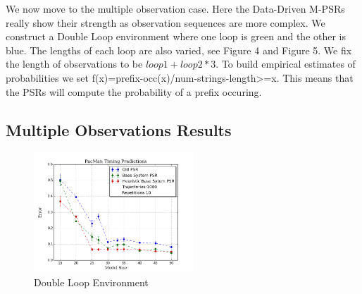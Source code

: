 We now move to the multiple observation case. Here the Data-Driven M-PSRs really show their strength as observation sequences are more complex. We construct a Double Loop environment where one loop is green and the other is blue. The lengths of each loop are also varied, see Figure 4 and Figure 5. We fix the length of observations to be $loop1 + loop2 * 3$. To build empirical estimates of probabilities we set f(x)=prefix-occ(x)/num-strings-length>=x. This means that the PSRs will compute the probability of a prefix occuring.

\subsection{Multiple Observations Results}

\begin{figure}[ht!]
\centering
\includegraphics[width=60mm]{uCOREPICS/PacManTimingHeuristicsIncluded.png}
\caption{Double Loop Environment\label{overflow}}
\end{figure}
